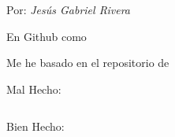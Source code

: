 \documentclass[a4paper, 12pt]{article}
\begin{document}
\begin{flushright}
  Por: \textit{Jesús Gabriel Rivera}

  En \faGithub \hspace{0.1cm} Github como 

  Me he basado en el repositorio de \faGithub {}
\end{flushright}

\hrulefill %
\vspace{0.5cm} %

\begin{center}
  \huge\textbf{} 
	\vspace{0.5cm} %
\end{center}

\newpage

\newpage

\newpage

\newpage

\newpage


Mal Hecho:
\begin{lstlisting}[language=TypeScript, style=badstyle]
\end{lstlisting}
\vspace{0.5cm} %

Bien Hecho:
\begin{lstlisting}[language=TypeScript, style=goodstyle]
\end{lstlisting}
\end{document}
